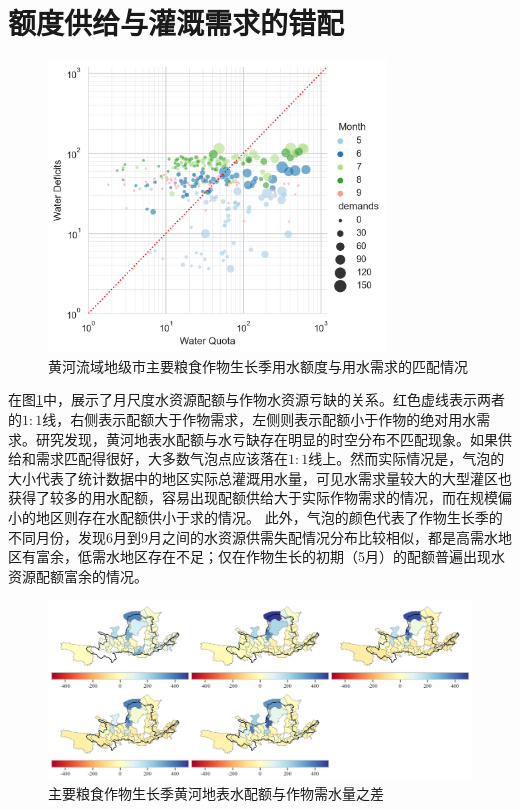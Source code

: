 
\section{额度供给与灌溉需求的错配}

\begin{figure}[htb]
    \centering
    \includegraphics[width=0.8\textwidth]{img/ch6/ch6_matches.png}
    \caption{黄河流域地级市主要粮食作物生长季用水额度与用水需求的匹配情况}\label{ch6:fig:matches}
\end{figure}

在图\ref{ch6:fig:matches}中，展示了月尺度水资源配额与作物水资源亏缺的关系。红色虚线表示两者的$1:1$线，右侧表示配额大于作物需求，左侧则表示配额小于作物的绝对用水需求。研究发现，黄河地表水配额与水亏缺存在明显的时空分布不匹配现象。如果供给和需求匹配得很好，大多数气泡点应该落在$1:1$线上。然而实际情况是，气泡的大小代表了统计数据中的地区实际总灌溉用水量，可见水需求量较大的大型灌区也获得了较多的用水配额，容易出现配额供给大于实际作物需求的情况，而在规模偏小的地区则存在水配额供小于求的情况。
此外，气泡的颜色代表了作物生长季的不同月份，发现6月到9月之间的水资源供需失配情况分布比较相似，都是高需水地区有富余，低需水地区存在不足；仅在作物生长的初期（5月）的配额普遍出现水资源配额富余的情况。

\begin{figure}[htb]
    \centering
    \includegraphics[width=\textwidth]{img/ch6/ch6_deficits_map.png}
    \caption{主要粮食作物生长季黄河地表水配额与作物需水量之差}\label{ch6:fig:deficits_maps}
\end{figure}

